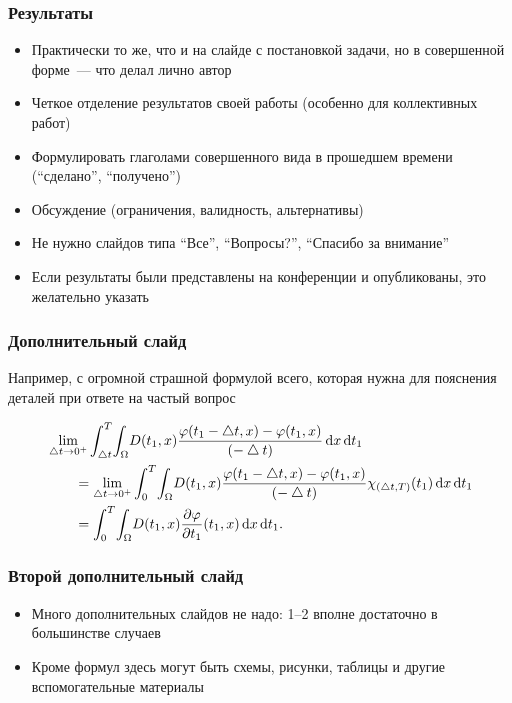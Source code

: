 \documentclass
  [aspectratio=1610] %
  {beamer}
\begin{document}
\begin{frame}
    \frametitle{Результаты}
    \begin{itemize}
        \item Практически то же, что и на слайде с постановкой задачи, но в совершенной форме~--- что делал лично автор
        \item Четкое отделение результатов своей работы (особенно для коллективных работ)
        \item Формулировать глаголами совершенного вида в прошедшем времени (\enquote{сделано}, \enquote{получено})
        \item Обсуждение (ограничения, валидность, альтернативы)
        \item Не нужно слайдов типа \enquote{Все}, \enquote{Вопросы?}, \enquote{Спасибо за внимание}
    \end{itemize}

    \begin{itemize}
        \item Если результаты были представлены на конференции и опубликованы, это желательно указать
    \end{itemize}
\end{frame}

\appendix

\begin{frame}
    \frametitle{Дополнительный слайд}
    Например, с огромной страшной формулой всего, которая нужна для пояснения деталей при ответе на частый вопрос

    \begin{align*}
        \MoveEqLeft \lim_{\bigtriangleup t \to 0^+}\int_{\bigtriangleup t}^{T} \! \int_{\Omega} \! D(t_1,x) \frac{\varphi(t_1-\bigtriangleup t,x)-\varphi(t_1,x)}{(-\bigtriangleup t)} \, \mathrm{d}x \, \mathrm{d}t_1 \\
        &= \lim_{\bigtriangleup t \to 0^+} \int_{0}^{T} \! \int_{\Omega} \! D(t_1,x) \frac{\varphi(t_1-\bigtriangleup t,x)-\varphi(t_1,x)}{(-\bigtriangleup t)} \chi_{(\bigtriangleup t,T)}(t_1) \, \mathrm{d}x \, \mathrm{d}t_1 \\
        &=\int_{0}^{T} \! \int_{\Omega} \! D(t_1,x) \frac{\partial \varphi}{\partial t_1} (t_1,x) \, \mathrm{d}x \, \mathrm{d}t_1 .
    \end{align*}
\end{frame}

\begin{frame}
    \frametitle{Второй дополнительный слайд}
    \begin{itemize}
        \item Много дополнительных слайдов не надо: 1--2 вполне достаточно в большинстве случаев
        \item Кроме формул здесь могут быть схемы, рисунки, таблицы и другие вспомогательные материалы
    \end{itemize}

\end{frame}
\end{document}
